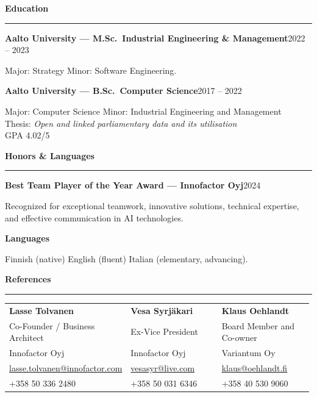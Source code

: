 \documentclass[10pt,a4paper]{article}
\newcommand{\cvsection}[1]{%
  \vspace{9pt}%
  {\textbf{#1}}\par
  \vspace{1.5pt}\hrule\vspace{5pt}}
\newcommand{\entry}[2]{%
  \needspace{3\baselineskip}%
  \vspace{4.5pt}%
  \textbf{#1}\hfill #2\par\nopagebreak\vspace{0.5pt}}
\begin{document}
\cvsection{Education}

\entry{Aalto University --- M.Sc.\ Industrial Engineering \& Management}{2022 -- 2023}
Major: Strategy \textperiodcentered{} Minor: Software Engineering.

\entry{Aalto University --- B.Sc.\ Computer Science}{2017 -- 2022}
Major: Computer Science \textperiodcentered{} Minor: Industrial Engineering and Management\\
Thesis: \emph{Open and linked parliamentary data and its utilisation}\\
GPA 4.02/5

\cvsection{Honors \& Languages}

\entry{Best Team Player of the Year Award --- Innofactor Oyj}{2024}
Recognized for exceptional teamwork, innovative solutions, technical expertise, and effective communication in AI technologies.

\entry{Languages}{}
Finnish (native) \textperiodcentered{} English (fluent) \textperiodcentered{} Italian (elementary, advancing).

\cvsection{References}

\vspace{2pt}
\begin{tabular}{@{}p{0.33\linewidth}@{}p{0.33\linewidth}@{}p{0.33\linewidth}@{}}
\textbf{Lasse Tolvanen} & \textbf{Vesa Syrjäkari} & \textbf{Klaus Oehlandt} \\
Co-Founder / Business Architect & Ex-Vice President & Board Member and Co-owner \\
Innofactor Oyj & Innofactor Oyj & Variantum Oy \\
\href{mailto:lasse.tolvanen@innofactor.com}{lasse.tolvanen@innofactor.com} & \href{mailto:vesasyr@live.com}{vesasyr@live.com} & \href{mailto:klaus@oehlandt.fi}{klaus@oehlandt.fi} \\
+358 50 336 2480 & +358 50 031 6346 & +358 40 530 9060 \\
\end{tabular}
\end{document}
